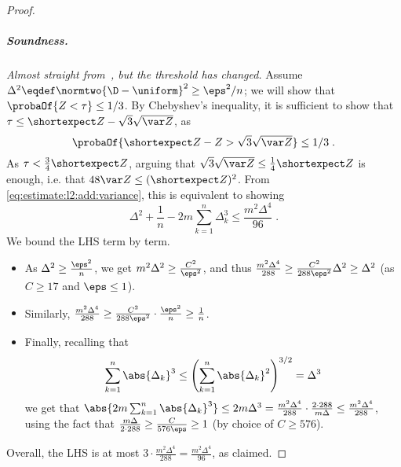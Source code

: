 \begin{proof}
\subparagraph{Soundness.} \textit{\emph{Almost} straight from~\cite{DKN:15}, but the threshold has changed.}
Assume $\Delta^2\eqdef\normtwo{\D-\uniform}^2 \geq \eps^2/n$; we will show that $\probaOf{ Z < \tau } \leq 1/3$. By Chebyshev's inequality, it is sufficient to show that
$\tau \leq \shortexpect Z - \sqrt{3}\sqrt{\var Z}$, as \[
    \probaOf{ \shortexpect Z - Z > \sqrt{3}\sqrt{\var Z} } \leq 1/3\;.
\]
As $\tau < \frac{3}{4}\shortexpect Z$, arguing that $\sqrt{3}\sqrt{\var Z} \leq \frac{1}{4}\shortexpect Z$ is enough, i.e. that $48\var Z \leq (\shortexpect Z)^2$. From \eqref{eq:estimate:l2:add:variance}, this is equivalent to showing
\[
    \Delta^2 + \frac{1}{n} -2 m\sum_{k=1}^n \Delta_k^3 \leq \frac{m^2\Delta^4}{96}\;.
\]
We bound the LHS term by term.
\begin{itemize}
  \item As $\Delta^2 \geq \frac{\eps^2}{n}$, we get $m^2\Delta^2 \geq \frac{C^2}{\eps^2}$, and thus $\frac{m^2\Delta^4}{288} \geq \frac{C^2}{288\eps^2}\Delta^2 \geq \Delta^2$ (as $C \geq 17$ and $\eps \leq 1$).
  \item Similarly, $\frac{m^2\Delta^4}{288} \geq \frac{C^2}{288\eps^2}\cdot \frac{\eps^2}{n} \geq \frac{1}{n}$. 
  \item Finally, recalling that\footnotemark
  \[
    \sum_{k=1}^n \abs{\Delta_k}^3 \leq \left( \sum_{k=1}^n \abs{\Delta_k}^2 \right)^{3/2} = \Delta^3
  \]
  we get that $\abs{2m\sum_{k=1}^n \abs{\Delta_k}^3} \leq 2m \Delta^3 = \frac{m^2 \Delta^4}{288} \cdot \frac{2\cdot 288}{m\Delta} \leq \frac{m^2 \Delta^4}{288}$, using the fact that
  $\frac{m\Delta}{2\cdot 288} \geq \frac{C}{576\eps} \geq 1$ (by choice of $C \geq 576$).
\end{itemize}
Overall, the LHS is at most $3\cdot \frac{m^2 \Delta^4}{288} = \frac{m^2 \Delta^4}{96}$, as claimed.




\end{proof}
